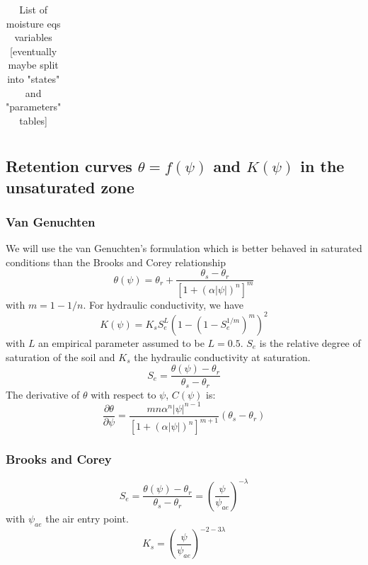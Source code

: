\documentclass{article}
\begin{document}
\begin{table}[]
{\begin{tabular}{lllll}
\hline
\end{tabular}%
}
\caption{List of moisture eqs variables [eventually maybe split into "states" and "parameters" tables]}
\end{table}

\subsection{Retention curves $\theta=f(\psi)$ and $K(\psi)$ in the unsaturated zone}
\label{SoilMoisture:Retention_Curves}
\subsubsection{Van Genuchten}
We will use the van Genuchten's formulation which is better behaved in saturated conditions than the Brooks and Corey relationship 
\begin{equation}
     \theta(\psi) = \theta_r + \frac{\theta_s - \theta_r}{\left[ 1+(\alpha |\psi|)^n \right]^{m}}
\end{equation}
with $m=1-1/n$.
For hydraulic conductivity, we have
\begin{equation}
     K(\psi) = K_{s} S_e^L \left (1 -  (1-S_e^{1/m})^m  \right)^2
\end{equation}
with $L$ an empirical parameter assumed to be $L=0.5$. $S_e$ is the relative degree of saturation of the soil and $K_{s}$ the hydraulic conductivity at saturation. 
\begin{equation}
     S_e = \frac{\theta(\psi) - \theta_r}{\theta_s - \theta_r}
\end{equation}
The derivative of $\theta$ with respect to $\psi$, $C(\psi)$ is:
\begin{equation}
     \frac{\partial \theta}{\partial \psi} =   \frac{m n\alpha^n |\psi|^{n-1}}{\left[ 1+(\alpha |\psi|)^n \right]^{m+1}} \left( \theta_s - \theta_r \right) 
\end{equation}



\subsubsection{Brooks and Corey}
\begin{equation}
     S_e = \frac{\theta(\psi) - \theta_r}{\theta_s - \theta_r} = \left( \frac{\psi}{\psi_{ae}}\right)^{-\lambda}
\end{equation}
with $\psi_{ae}$ the air entry point.
\begin{equation}
     K_s = \left( \frac{\psi}{\psi_{ae}}\right)^{-2-3\lambda}
\end{equation}
\end{document}
